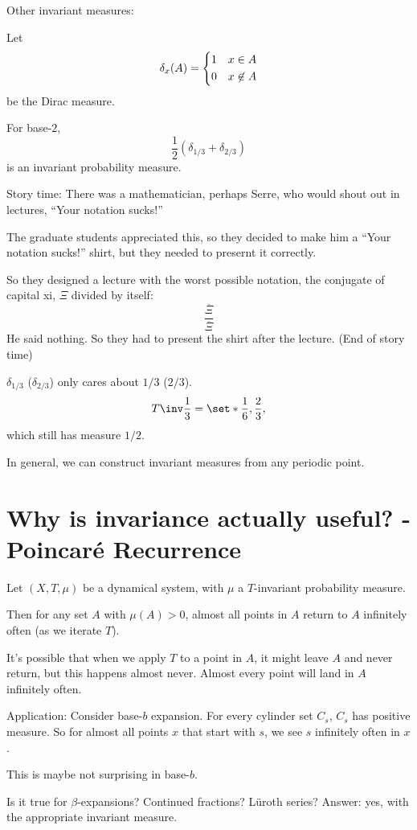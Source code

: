 \documentclass{article}
\theoremstyle{remark}
\begin{document}
\begin{example}
    Other invariant measures:

    Let 
    \[ \delta_x(A) = \begin{dcases} 1 & x\in A \\ 0 & x\not\in A \end{dcases}
    \]
    be the Dirac measure.

    For base-$2$,
    \[ \frac{1}{2} (\delta_{1/3} + \delta_{2/3}) \]
    is an invariant probability measure.
\end{example}

Story time: There was a mathematician, perhaps Serre, who would 
shout out in lectures, ``Your notation sucks!''

The graduate students appreciated this, so they decided
to make him a ``Your notation sucks!'' shirt, but they needed
to presernt it correctly.

So they designed a lecture with the worst possible notation,
the conjugate of capital xi, $\Xi$ divided by itself:
\[\frac{\overline{\Xi}}{\overline{\Xi}}\]
He said nothing.
So they had to present the shirt after the lecture.
(End of story time)

$\delta_{1/3}$ ($\delta_{2/3}$) only cares about $1/3$ ($2/3$).
\[ T\inv \frac{1}{3} = \set*{\frac{1}{6}, \frac{2}{3}}, \]
which still has measure $1/2$.

In general, we can construct invariant measures from any periodic
point.

\section{Why is invariance actually useful? - Poincar\'e Recurrence}
\begin{theorem}
    Let $(X,T,\mu)$ be a dynamical system, with $\mu$ a 
    $T$-invariant probability measure.

    Then for any set $A$ with $\mu(A) > 0$, almost all 
    points in $A$ return to $A$ infinitely often (as we 
    iterate $T$).
\end{theorem}

It's possible that when we apply $T$ to a point in $A$,
it might leave $A$ and never return, but this happens almost 
never. Almost every point will land in $A$ infinitely often.

Application: Consider base-$b$ expansion.
For every cylinder set $C_s$, $C_s$ has positive measure.
So for almost all points $x$ that start with $s$,
we see $s$ infinitely often in $x$.

This is maybe not surprising in base-$b$.

Is it true for $\beta$-expansions? Continued fractions?
L\"uroth series? Answer: yes, with the appropriate invariant 
measure.
\end{document}
